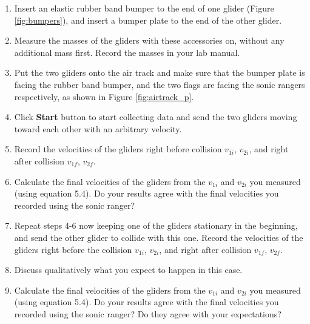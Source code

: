 \begin{enumerate}
\item Insert an elastic rubber band bumper to the end of one glider (Figure \ref{fig:bumpers}), and insert a bumper plate to the end of the other glider.
\item Measure the masses of the gliders with these accessories on, without any additional mass first. Record the masses in your lab manual.
\item Put the two gliders onto the air track and make sure that the bumper plate is facing the rubber band bumper, and the two flags are facing the sonic rangers respectively, as shown in Figure \ref{fig:airtrack_p}.
\item Click \textbf{Start} button to start collecting data and send the two gliders moving toward each other with an arbitrary velocity.
\item Record the velocities of the gliders right before collision $v_{1i}$, $v_{2i}$, and right after collision $v_{1f}$, $v_{2f}$.
    \item Calculate the final velocities of the gliders from the $v_{1i}$ and $v_{2i}$ you measured (using equation 5.4). Do your results agree with the final velocities you recorded using the sonic ranger?

\item Repeat steps 4-6 now keeping one of the gliders stationary in the beginning, and send the other glider to collide with this one. Record the velocities of the gliders right before the collision $v_{1i}$, $v_{2i}$, and right after collision $v_{1f}$, $v_{2f}$.
\item Discuss qualitatively what you expect to happen in this case.
    \item Calculate the final velocities of the gliders from the $v_{1i}$ and $v_{2i}$ you measured (using equation 5.4). Do your results agree with the final velocities you recorded using the sonic ranger? Do they agree with your expectations?


\end{enumerate}
